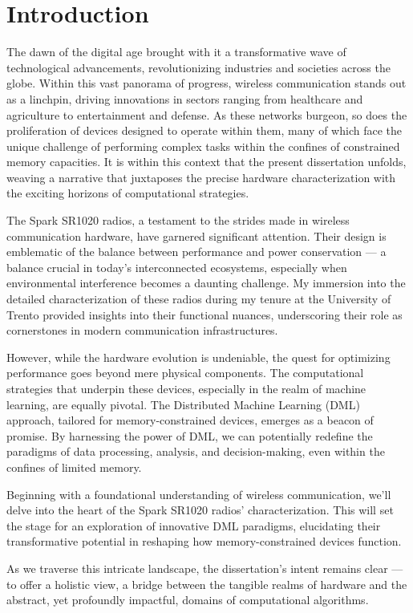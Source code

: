\chapter{Introduction}
\label{cha:introduction} 

The dawn of the digital age brought with it a transformative wave of technological advancements, revolutionizing industries and societies across the globe. Within this vast panorama of progress, wireless communication stands out as a linchpin, driving innovations in sectors ranging from healthcare and agriculture to entertainment and defense. As these networks burgeon, so does the proliferation of devices designed to operate within them, many of which face the unique challenge of performing complex tasks within the confines of constrained memory capacities. It is within this context that the present dissertation unfolds, weaving a narrative that juxtaposes the precise hardware characterization with the exciting horizons of computational strategies.

The Spark SR1020 radios, a testament to the strides made in wireless communication hardware, have garnered significant attention. Their design is emblematic of the balance between performance and power conservation — a balance crucial in today's interconnected ecosystems, especially when environmental interference becomes a daunting challenge. My immersion into the detailed characterization of these radios during my tenure at the University of Trento provided insights into their functional nuances, underscoring their role as cornerstones in modern communication infrastructures.

However, while the hardware evolution is undeniable, the quest for optimizing performance goes beyond mere physical components. The computational strategies that underpin these devices, especially in the realm of machine learning, are equally pivotal. The Distributed Machine Learning (DML) approach, tailored for memory-constrained devices, emerges as a beacon of promise. By harnessing the power of DML, we can potentially redefine the paradigms of data processing, analysis, and decision-making, even within the confines of limited memory.

Beginning with a foundational understanding of wireless communication, we'll delve into the heart of the Spark SR1020 radios' characterization. This will set the stage for an exploration of innovative DML paradigms, elucidating their transformative potential in reshaping how memory-constrained devices function.

As we traverse this intricate landscape, the dissertation's intent remains clear — to offer a holistic view, a bridge between the tangible realms of hardware and the abstract, yet profoundly impactful, domains of computational algorithms.

\newpage


